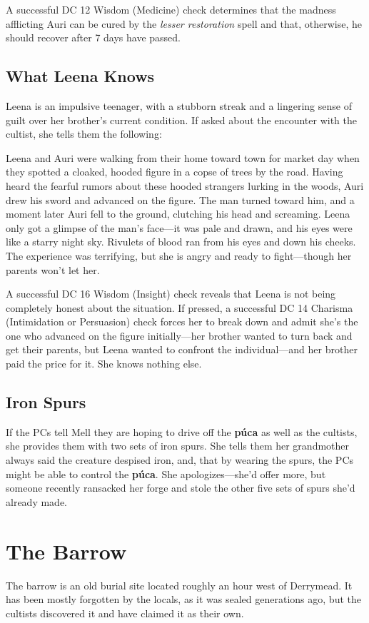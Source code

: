 \documentclass[10pt,a4paper,twoside,bg=print,twocolumn,openany,nodeprecatedcode]{dndbook}
\begin{document}
A successful DC 12 Wisdom (Medicine) check determines that the madness afflicting Auri can be cured by the \textit{lesser restoration} spell and that, otherwise, he should recover after 7 days have passed.

\subsection{What Leena Knows}
Leena is an impulsive teenager, with a stubborn streak and a lingering sense of guilt over her brother's current condition. If asked about the encounter with the cultist, she tells them the following:

Leena and Auri were walking from their home toward town for market day when they spotted a cloaked, hooded figure in a copse of trees by the road. Having heard the fearful rumors about these hooded strangers lurking in the woods, Auri drew his sword and advanced on the figure. The man turned toward him, and a moment later Auri fell to the ground, clutching his head and screaming. Leena only got a glimpse of the man's face—it was pale and drawn, and his eyes were like a starry night sky. Rivulets of blood ran from his eyes and down his cheeks. The experience was terrifying, but she is angry and ready to fight—though her parents won't let her.

A successful DC 16 Wisdom (Insight) check reveals that Leena is not being completely honest about the situation. If pressed, a successful DC 14 Charisma (Intimidation or Persuasion) check forces her to break down and admit she's the one who advanced on the figure initially—her brother wanted to turn back and get their parents, but Leena wanted to confront the individual—and her brother paid the price for it. She knows nothing else.

\subsection{Iron Spurs}
If the PCs tell Mell they are hoping to drive off the \textbf{púca} as well as the cultists, she provides them with two sets of iron spurs. She tells them her grandmother always said the creature despised iron, and, that by wearing the spurs, the PCs might be able to control the \textbf{púca}. She apologizes—she'd offer more, but someone recently ransacked her forge and stole the other five sets of spurs she'd already made.

\section{The Barrow}
The barrow is an old burial site located roughly an hour west of Derrymead. It has been mostly forgotten by the locals, as it was sealed generations ago, but the cultists discovered it and have claimed it as their own.
\end{document}
